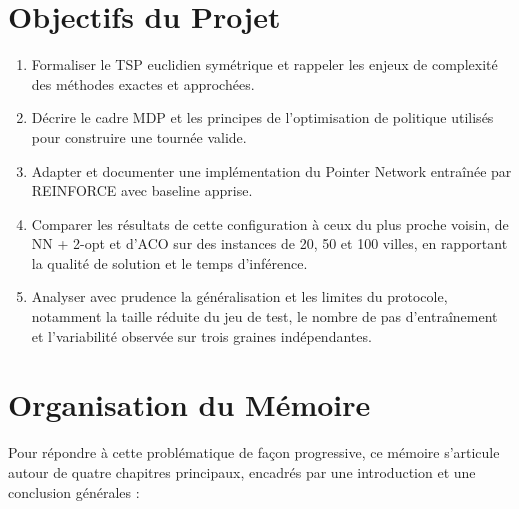 \documentclass[12pt, a4paper, twoside, openright]{book}
\begin{document}
	\section*{Objectifs du Projet}
	\begin{enumerate}[leftmargin=*]
		\item Formaliser le TSP euclidien symétrique et rappeler les enjeux de complexité des méthodes exactes et approchées.
		\item Décrire le cadre MDP et les principes de l'optimisation de politique utilisés pour construire une tournée valide.
		\item Adapter et documenter une implémentation du Pointer Network entraînée par REINFORCE avec baseline apprise.
		\item Comparer les résultats de cette configuration à ceux du plus proche voisin, de NN + 2-opt et d'ACO sur des instances de 20, 50 et 100 villes, en rapportant la qualité de solution et le temps d'inférence.
		\item Analyser avec prudence la généralisation et les limites du protocole, notamment la taille réduite du jeu de test, le nombre de pas d'entraînement et l'variabilité observée sur trois graines indépendantes.
	\end{enumerate}
	
	\section*{Organisation du M\'emoire}
	
	Pour répondre à cette problématique de façon progressive, ce mémoire s'articule autour de quatre chapitres principaux, encadrés par une introduction et une conclusion générales :
	
\end{document}
